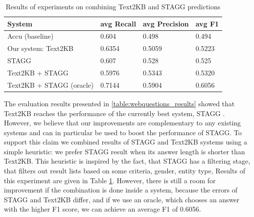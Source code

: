 


\begin{table}
\centering
\caption{Results of experiments on combining Text2KB and STAGG predictions}
\label{table:combine_stagg}
\begin{tabular}{| p{4cm} | p{1cm} | p{1cm} | p{1cm} | }
\hline
System & avg Recall & avg Precision & avg F1 \\
\hline
Accu (baseline) \cite{ACCU:2015} & 0.604 & 0.498 & 0.494\\
Our system: Text2KB & 0.6354 & 0.5059 & 0.5223 \\
STAGG \cite{yih2015semantic} & 0.607 & 0.528 & 0.525\\
\hline
Text2KB + STAGG & 0.5976 & 0.5343 & 0.5320 \\
Text2KB + STAGG (oracle) & 0.7144 & 0.5904 & 0.6056 \\
\hline
\end{tabular}
\end{table}

The evaluation results presented in \ref{table:webquestions_results} showed that Text2KB reaches the performance of the currently best system, STAGG \cite{yih2015semantic}.
However, we believe that our improvements are complementary to any existing systems and can in particular be used to boost the performance of STAGG.
To support this claim we combined results of STAGG and Text2KB systems using a simple heuristic: we prefer STAGG result when its answer length is shorter than Text2KB.
This heuristic is inspired by the fact, that STAGG has a filtering stage, that filters out result lists based on some criteria, \ie gender, entity type, \etc
Results of this experiment are given in Table \ref{table:combine_stagg}.
However, there is still a room for improvement if the combination is done inside a system, because the errors of STAGG and Text2KB differ, and if we use an oracle, which chooses an answer with the higher F1 score, we can achieve an average F1 of 0.6056.

